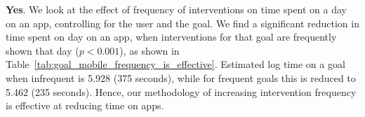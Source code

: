 \textbf{Yes}. We look at the effect of frequency of interventions on time spent on a day on an app, controlling for the user and the goal. We find a significant reduction in time spent on day on an app, when interventions for that goal are frequently shown that day ($p < 0.001$), as shown in Table~\ref{tab:goal_mobile_frequency_is_effective}. Estimated log time on a goal when infrequent is 5.928 (375 seconds), while for frequent goals this is reduced to 5.462 (235 seconds). Hence, our methodology of increasing intervention frequency is effective at reducing time on apps.








